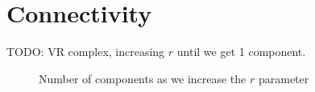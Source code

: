 \documentclass[a4paper, 12pt]{article}
\begin{document}
\section{Connectivity}
TODO: VR complex, increasing $r$ until we get 1 component. 

\begin{figure}[H]
        \centering
        \caption{Number of components as we increase the $r$ parameter}
\end{figure}
\end{document}
